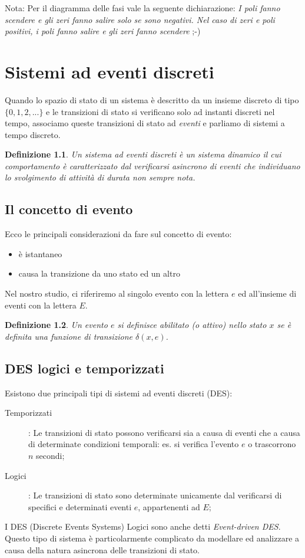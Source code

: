 \documentclass[a4paper]{report}
\newtheorem{definizione}{Definizione}
\begin{document}
Nota: Per il diagramma delle fasi vale la seguente dichiarazione:
{\em I poli fanno scendere e gli zeri fanno salire solo se sono
  negativi. Nel caso di zeri e poli positivi, i poli fanno salire e
                     gli zeri fanno scendere} ;-)


\chapter{Sistemi ad eventi discreti}
Quando lo spazio di stato di un sistema \`e descritto da un insieme
discreto di tipo $\{0, 1, 2, ...\}$ e le transizioni di stato si
verificano solo ad instanti discreti nel tempo, associamo queste
transizioni di stato ad {\em eventi} e parliamo di
sistemi a tempo discreto.

\begin{definizione}\label{def:des}
  Un sistema ad eventi discreti \`e un sistema dinamico il cui
  comportamento \`e caratterizzato dal verificarsi asincrono di eventi
  che individuano lo svolgimento di attivit\`a di durata non sempre nota.
\end{definizione}

\section{Il concetto di evento}
Ecco le principali considerazioni da fare sul concetto di evento:
\begin{itemize}
\item \`e istantaneo
\item causa la transizione da uno stato ed un altro
\end{itemize}
Nel nostro studio, ci riferiremo al singolo evento con la lettera $e$
ed all'insieme di eventi con la lettera $E$.
\begin{definizione}
  Un evento $e$ si definisce abilitato (o attivo) nello stato $x$ se
  \`e definita una funzione di transizione $\delta (x,e)$.
\end{definizione}

\section{DES logici e temporizzati}
Esistono due principali tipi di sistemi ad eventi discreti (DES):
\begin{description}
\item[Temporizzati]:
  Le transizioni di stato possono verificarsi sia a causa di eventi
  che a causa di determinate condizioni temporali: es. si verifica
  l'evento $e$ o trascorrono $n$ secondi;
\item [Logici]:
  Le transizioni di stato sono determinate unicamente dal verificarsi
  di specifici e determinati eventi $e$, appartenenti ad $E$;
\end{description}
I DES (Discrete Events Systems) Logici sono anche detti {\em
  Event-driven DES}. Questo tipo di sistema \`e particolarmente complicato da
modellare ed analizzare a causa della natura asincrona delle
transizioni di stato.
\end{document}
